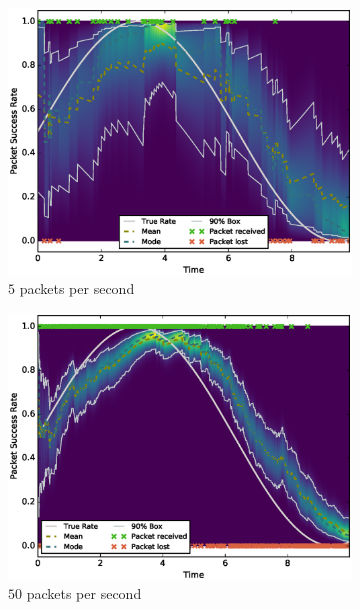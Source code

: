 \documentclass[10pt,a4paper]{article}
\begin{document}
\begin{figure}[h]
  \centering
  \begin{subfigure}[b]{0.45\textwidth}
		\includegraphics[width=\textwidth]{trust/sin-2-rate-5}
		\caption{$5$ packets per second}
	\end{subfigure}
  \begin{subfigure}[b]{0.45\textwidth}
		\includegraphics[width=\textwidth]{trust/sin-2-rate-50}
		\caption{$50$ packets per second}
	\end{subfigure}
  \begin{subfigure}[b]{\textwidth}

\end{subfigure}
\end{figure}
\end{document}
